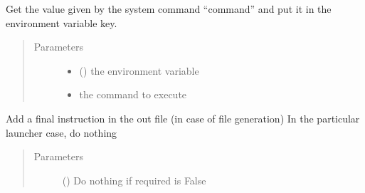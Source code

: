 \documentclass[a4paper,10pt,english]{sphinxmanual}
\begin{document}
\begin{fulllineitems}

\begin{fulllineitems}
\label{\detokenize{commands/apidoc/src:src.fileEnviron.LauncherFileEnviron.command_value}}
Get the value given by the system command “command” 
and put it in the environment variable key.
\begin{quote}\begin{description}
\item[{Parameters}] \leavevmode\begin{itemize}
\item {} 
 () \textendash{} the environment variable

\item {} 
 \textendash{} the command to execute

\end{itemize}

\end{description}\end{quote}

\end{fulllineitems}


\begin{fulllineitems}
\label{\detokenize{commands/apidoc/src:src.fileEnviron.LauncherFileEnviron.finish}}
Add a final instruction in the out file (in case of file generation)
In the particular launcher case, do nothing
\begin{quote}\begin{description}
\item[{Parameters}] \leavevmode
{} () \textendash{} Do nothing if required is False

\end{description}\end{quote}

\end{fulllineitems}



\end{fulllineitems}
\end{document}
